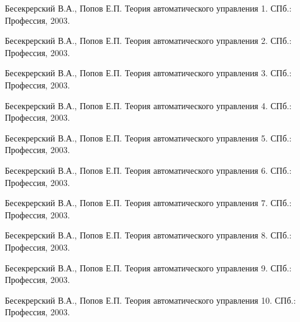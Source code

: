 
\label{section_bibliography}

\begin{thebibliography}{99} %

Бесекрерский В.А., Попов Е.П. Теория автоматического управления 1. СПб.: Профессия, 2003.

Бесекрерский В.А., Попов Е.П. Теория автоматического управления 2. СПб.: Профессия, 2003.

Бесекрерский В.А., Попов Е.П. Теория автоматического управления 3. СПб.: Профессия, 2003.

Бесекрерский В.А., Попов Е.П. Теория автоматического управления 4. СПб.: Профессия, 2003.

Бесекрерский В.А., Попов Е.П. Теория автоматического управления 5. СПб.: Профессия, 2003.

Бесекрерский В.А., Попов Е.П. Теория автоматического управления 6. СПб.: Профессия, 2003.

Бесекрерский В.А., Попов Е.П. Теория автоматического управления 7. СПб.: Профессия, 2003.

Бесекрерский В.А., Попов Е.П. Теория автоматического управления 8. СПб.: Профессия, 2003.

Бесекрерский В.А., Попов Е.П. Теория автоматического управления 9. СПб.: Профессия, 2003.

Бесекрерский В.А., Попов Е.П. Теория автоматического управления 10. СПб.: Профессия, 2003.
\end{thebibliography}